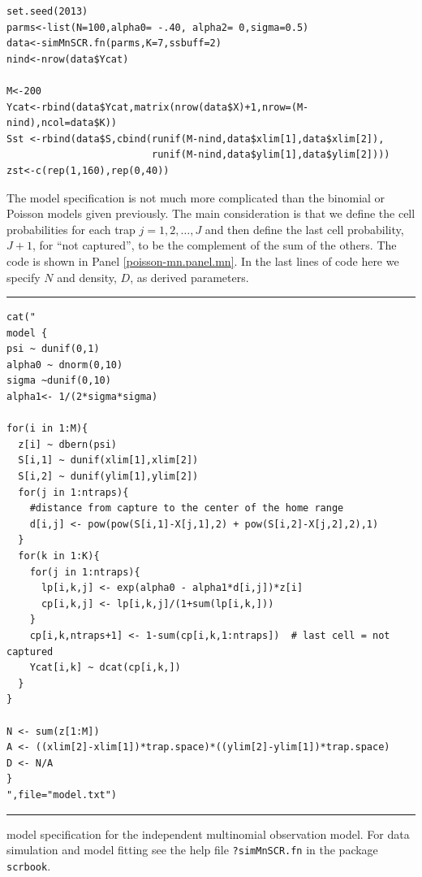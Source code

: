 {\small
\begin{verbatim}
set.seed(2013)
parms<-list(N=100,alpha0= -.40, alpha2= 0,sigma=0.5)
data<-simMnSCR.fn(parms,K=7,ssbuff=2)
nind<-nrow(data$Ycat)

M<-200
Ycat<-rbind(data$Ycat,matrix(nrow(data$X)+1,nrow=(M-nind),ncol=data$K))
Sst <-rbind(data$S,cbind(runif(M-nind,data$xlim[1],data$xlim[2]),
                         runif(M-nind,data$ylim[1],data$ylim[2])))
zst<-c(rep(1,160),rep(0,40))
\end{verbatim}
}

The model specification is not much more complicated than the binomial
or Poisson models given previously. The main consideration is that we
define the cell probabilities for each trap $j=1,2,\dots,J$ and then
define the last cell probability, $J+1$, for ``not captured'', to be
the complement of the sum of the others. The code is shown in Panel
\ref{poisson-mn.panel.mn}.  In the last lines of code here we specify
$N$ and density, $D$, as derived parameters.

\begin{panel}[htp]
\centering
\rule[0.15in]{\textwidth}{.03in}
{\small
\begin{verbatim}
cat("
model {
psi ~ dunif(0,1)
alpha0 ~ dnorm(0,10)
sigma ~dunif(0,10)
alpha1<- 1/(2*sigma*sigma)

for(i in 1:M){
  z[i] ~ dbern(psi)
  S[i,1] ~ dunif(xlim[1],xlim[2])
  S[i,2] ~ dunif(ylim[1],ylim[2])
  for(j in 1:ntraps){
    #distance from capture to the center of the home range
    d[i,j] <- pow(pow(S[i,1]-X[j,1],2) + pow(S[i,2]-X[j,2],2),1)
  }
  for(k in 1:K){
    for(j in 1:ntraps){
      lp[i,k,j] <- exp(alpha0 - alpha1*d[i,j])*z[i]
      cp[i,k,j] <- lp[i,k,j]/(1+sum(lp[i,k,]))
    }
    cp[i,k,ntraps+1] <- 1-sum(cp[i,k,1:ntraps])  # last cell = not captured
    Ycat[i,k] ~ dcat(cp[i,k,])
  }
}

N <- sum(z[1:M])
A <- ((xlim[2]-xlim[1])*trap.space)*((ylim[2]-ylim[1])*trap.space)
D <- N/A
}
",file="model.txt")

\end{verbatim}
}
\rule[-0.15in]{\textwidth}{.03in}
\caption{
\winbugs model specification for the independent multinomial
observation model. For data simulation and model fitting see the
help file \mbox{\tt ?simMnSCR.fn} in the \R package \mbox{\tt scrbook}.
}
\label{poisson-mn.panel.mn}
\end{panel}

